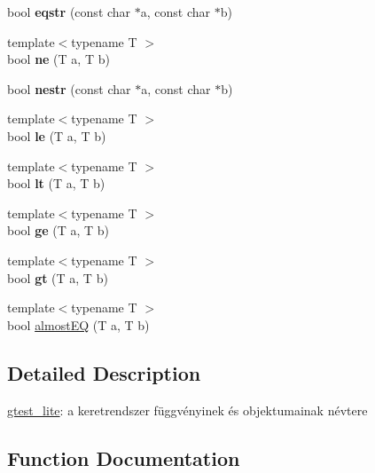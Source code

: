 \begin{DoxyCompactItemize}
bool {\bfseries eqstr} (const char $\ast$a, const char $\ast$b)
\item 
\mbox{\label{namespacegtest__lite_a9a1485affebbed604f7cac69f70072dc}} 
{\footnotesize template$<$typename T $>$ }\\bool {\bfseries ne} (T a, T b)
\item 
\mbox{\label{namespacegtest__lite_a0a34b1bb0d55bc0c6a3e878ec2bcd49f}} 
bool {\bfseries nestr} (const char $\ast$a, const char $\ast$b)
\item 
\mbox{\label{namespacegtest__lite_a92068d494867b61abeef5942eefac3a3}} 
{\footnotesize template$<$typename T $>$ }\\bool {\bfseries le} (T a, T b)
\item 
\mbox{\label{namespacegtest__lite_acfefb55c5d3713c79b659bbd18d9423c}} 
{\footnotesize template$<$typename T $>$ }\\bool {\bfseries lt} (T a, T b)
\item 
\mbox{\label{namespacegtest__lite_ae8c2517b99b688c6136d8c7c18551da5}} 
{\footnotesize template$<$typename T $>$ }\\bool {\bfseries ge} (T a, T b)
\item 
\mbox{\label{namespacegtest__lite_a2075d101da98f80f569b0737c5185718}} 
{\footnotesize template$<$typename T $>$ }\\bool {\bfseries gt} (T a, T b)
\item 
{\footnotesize template$<$typename T $>$ }\\bool \hyperlink{namespacegtest__lite_affbf9748c4e4dec6db137f7c147fee61}{almost\+EQ} (T a, T b)
\end{DoxyCompactItemize}


\subsection{Detailed Description}
\hyperlink{namespacegtest__lite}{gtest\+\_\+lite}\+: a keretrendszer függvényinek és objektumainak névtere 

\subsection{Function Documentation}
\mbox{\label{namespacegtest__lite_affbf9748c4e4dec6db137f7c147fee61}} 
